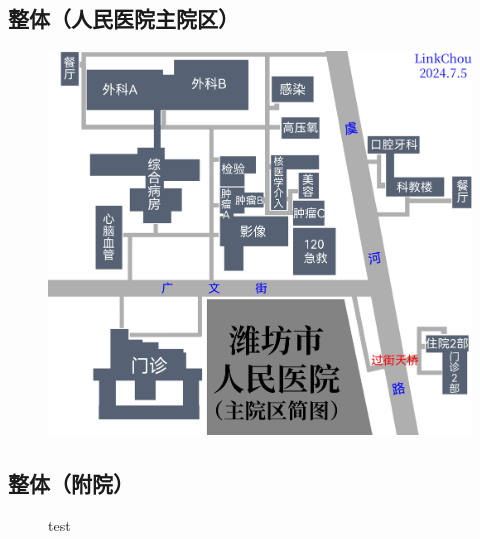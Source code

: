 \subsection[整体（人民医院主院区）]{整体（人民医院主院区）}
\begin{figure}[H]
    \centering
    \vspace{8em}
    \includegraphics*[width=\linewidth]{resources/map/人民医院.pdf}
    \label{map_yuhe_renmin_hospital}
\end{figure}

\newpage
\subsection[整体（附院）]{整体（附院）}
\begin{figure}[H]
    \centering
    test
\end{figure}

\newpage